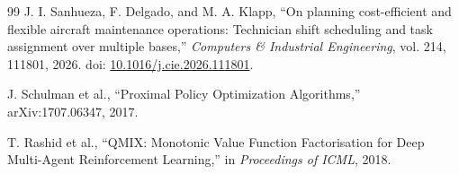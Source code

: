 \documentclass[11pt]{article}
\begin{document}
\begin{thebibliography}{99}
J. I. Sanhueza, F. Delgado, and M. A. Klapp, ``On planning cost-efficient and flexible aircraft maintenance operations: Technician shift scheduling and task assignment over multiple bases,'' \emph{Computers \& Industrial Engineering}, vol. 214, 111801, 2026. doi: \href{https://doi.org/10.1016/j.cie.2026.111801}{10.1016/j.cie.2026.111801}.

J. Schulman et al., ``Proximal Policy Optimization Algorithms,'' arXiv:1707.06347, 2017.

T. Rashid et al., ``QMIX: Monotonic Value Function Factorisation for Deep Multi-Agent Reinforcement Learning,'' in \emph{Proceedings of ICML}, 2018.

\end{thebibliography}
\end{document}
